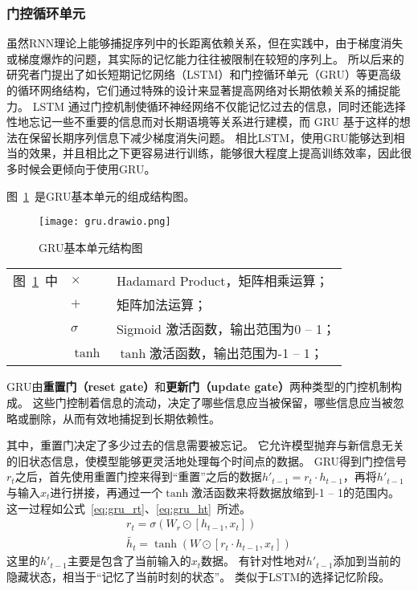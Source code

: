 \subsubsection*{门控循环单元}
虽然RNN理论上能够捕捉序列中的长距离依赖关系，但在实践中，由于梯度消失或梯度爆炸的问题，其实际的记忆能力往往被限制在较短的序列上。
所以后来的研究者门提出了如长短期记忆网络（LSTM）\cite{memory2010long}和门控循环单元（GRU）\cite{cho2014learning}等更高级的循环网络结构，它们通过特殊的设计来显著提高网络对长期依赖关系的捕捉能力。
LSTM 通过门控机制使循环神经网络不仅能记忆过去的信息，同时还能选择性地忘记一些不重要的信息而对长期语境等关系进行建模，而 GRU 基于这样的想法在保留长期序列信息下减少梯度消失问题。
相比LSTM，使用GRU能够达到相当的效果，并且相比之下更容易进行训练，能够很大程度上提高训练效率，因此很多时候会更倾向于使用GRU。

图~\ref{fig:GRUunit}~是GRU基本单元的组成结构图。
\begin{figure}[htbp] 
  \centering
  \texttt{[image: gru.drawio.png]}
  \caption{GRU基本单元结构图}
  \label{fig:GRUunit}
\end{figure}
\begin{flushleft}
  \renewcommand\arraystretch{1.25}
  \begin{tabularx}{\textwidth}{@{}>{\normalsize\rm}l@{\quad}>{\normalsize\rm}l@{——}>{\normalsize\rm}X@{}}
  图~\ref{fig:GRUunit}~中
  &  $\times$ &Hadamard Product，矩阵相乘运算；\\
  &  $+$ &矩阵加法运算；\\
  &  $σ$ &Sigmoid 激活函数，输出范围为0 -- 1；\\
  &  $\tanh$ & $\tanh$激活函数，输出范围为-1 -- 1；\\
  \end{tabularx}\vspace{.5ex}%
\end{flushleft}

GRU由\textbf{重置门（reset gate）}和\textbf{更新门（update gate）}两种类型的门控机制构成。
这些门控制着信息的流动，决定了哪些信息应当被保留，哪些信息应当被忽略或删除，从而有效地捕捉到长期依赖性。

其中，重置门决定了多少过去的信息需要被忘记。
它允许模型抛弃与新信息无关的旧状态信息，使模型能够更灵活地处理每个时间点的数据。
GRU得到门控信号$r_t$之后，首先使用重置门控来得到“重置”之后的数据$h'_{t-1} = r_t \cdot h_{t-1}$，再将$h'_{t-1}$与输入$x_t$进行拼接，再通过一个$\tanh$激活函数来将数据放缩到-1 -- 1的范围内。
这一过程如公式~\ref{eq:gru_rt}、\ref{eq:gru_ht}~所述。
\begin{gather}
  r_t = σ(W_r \odot [h_{t-1},x_t]) \label{eq:gru_rt} \\
  \tilde{h_t} = \tanh(W \odot [r_t \cdot h_{t-1} , x_t]) \label{eq:gru_ht}
\end{gather}
这里的$h'_{t-1}$主要是包含了当前输入的$x_t$数据。
有针对性地对$h'_{t-1}$添加到当前的隐藏状态，相当于“记忆了当前时刻的状态”。
类似于LSTM的选择记忆阶段。


